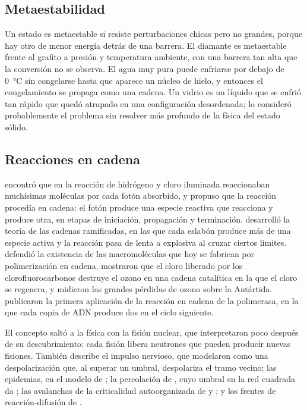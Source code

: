 \documentclass[11pt,a4paper]{article}
\begin{document}
\subsection{Metaestabilidad}

Un estado es metaestable si resiste perturbaciones chicas pero no grandes, porque hay otro de menor energía detrás de una barrera. El diamante es metaestable frente al grafito a presión y temperatura ambiente, con una barrera tan alta que la conversión no se observa. El agua muy pura puede enfriarse por debajo de 0~°C sin congelarse hasta que aparece un núcleo de hielo, y entonces el congelamiento se propaga como una cadena. Un vidrio es un líquido que se enfrió tan rápido que quedó atrapado en una configuración desordenada; \textcite{anderson1995} lo consideró probablemente el problema sin resolver más profundo de la física del estado sólido.

\subsection{Reacciones en cadena}

\textcite{bodenstein1913} encontró que en la reacción de hidrógeno y cloro iluminada reaccionaban muchísimas moléculas por cada fotón absorbido, y propuso que la reacción procedía en cadena: el fotón produce una especie reactiva que reacciona y produce otra, en etapas de iniciación, propagación y terminación. \textcite{semenov1935} desarrolló la teoría de las cadenas ramificadas, en las que cada eslabón produce más de una especie activa y la reacción pasa de lenta a explosiva al cruzar ciertos límites. \textcite{staudinger1920} defendió la existencia de las macromoléculas que hoy se fabrican por polimerización en cadena. \textcite{molina1974} mostraron que el cloro liberado por los clorofluorocarbonos destruye el ozono en una cadena catalítica en la que el cloro se regenera, y \textcite{farman1985} midieron las grandes pérdidas de ozono sobre la Antártida. \textcite{saiki1985} publicaron la primera aplicación de la reacción en cadena de la polimerasa, en la que cada copia de ADN produce dos en el ciclo siguiente.

El concepto saltó a la física con la fisión nuclear, que \textcite{meitner1939} interpretaron poco después de su descubrimiento: cada fisión libera neutrones que pueden producir nuevas fisiones. También describe el impulso nervioso, que \textcite{hodgkin1952} modelaron como una despolarización que, al superar un umbral, despolariza el tramo vecino; las epidemias, en el modelo de \textcite{kermack1927}; la percolación de \textcite{broadbent1957}, cuyo umbral en la red cuadrada da \textcite{stauffer1994}; las avalanchas de la criticalidad autoorganizada de \textcite{bak1987} y \textcite{bak1996}; y los frentes de reacción-difusión de \textcite{fisher1937}.
\end{document}
